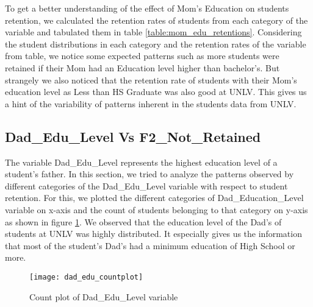 \documentclass[11pt,openright]{report}
\begin{document}
To get a better understanding of the effect of Mom's Education on students retention, we calculated the retention rates of students from each category of the variable and tabulated them in table \ref{table:mom_edu_retentions}. Considering the student distributions in each category and the retention rates of the variable from table, we notice some expected patterns such as more students were retained if their Mom had an Education level higher than bachelor's. But strangely we also noticed that the retention rate of students with their Mom's education level as Less than HS Graduate was also good at UNLV. This gives us a hint of the variability of patterns inherent in the students data from UNLV.


\subsection {Dad\_Edu\_Level Vs F2\_Not\_Retained}
The variable Dad\_Edu\_Level represents the highest education level of a student's father. In this section, we tried to analyze the patterns observed by different categories of the Dad\_Edu\_Level variable with respect to student retention. For this, we plotted the different categories of Dad\_Education\_Level variable on x-axis and the count of students belonging to that category on y-axis as shown in figure \ref{fig:dad_edu_F2NotRetained_plot}. We observed that the education level of the Dad's of students at UNLV was highly distributed. It especially gives us the information that most of the student's Dad's had a minimum education of High School or more.

\begin{figure}
	\centering
	\texttt{[image: dad\_edu\_countplot]}
	\caption{Count plot of Dad\_Edu\_Level variable }
	\label{fig:dad_edu_F2NotRetained_plot}
\end{figure}
\end{document}

